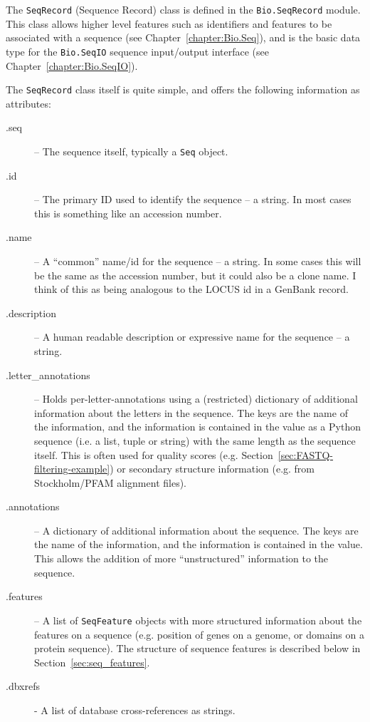 \documentclass{report}
\begin{document}
The \verb|SeqRecord| (Sequence Record) class is defined in the \verb|Bio.SeqRecord| module. This class allows higher level features such as identifiers and features to be associated with a sequence (see Chapter~\ref{chapter:Bio.Seq}), and is the basic data type for the \verb|Bio.SeqIO| sequence input/output interface (see Chapter~\ref{chapter:Bio.SeqIO}).

The \verb|SeqRecord| class itself is quite simple, and offers the following information as attributes:

\begin{description}
  \item[.seq] -- The sequence itself, typically a \verb|Seq| object.

  \item[.id] -- The primary ID used to identify the sequence -- a string. In most cases this is something like an accession number.

  \item[.name] -- A ``common'' name/id for the sequence -- a string. In some cases this will be the same as the accession number, but it could also be a clone name. I think of this as being analogous to the LOCUS id in a GenBank record.

  \item[.description] -- A human readable description or expressive name for the sequence -- a string.
  
  \item[.letter\_annotations] -- Holds per-letter-annotations using a (restricted) dictionary of additional information about the letters in the sequence. The keys are the name of the information, and the information is contained in the value as a Python sequence (i.e. a list, tuple or string) with the same length as the sequence itself.  This is often used for quality scores (e.g. Section~\ref{sec:FASTQ-filtering-example}) or secondary structure information (e.g. from Stockholm/PFAM alignment files).

  \item[.annotations] -- A dictionary of additional information about the sequence. The keys are the name of the information, and the information is contained in the value. This allows the addition of more ``unstructured'' information to the sequence.
  
  \item[.features] -- A list of \verb|SeqFeature| objects with more structured information about the features on a sequence (e.g. position of genes on a genome, or domains on a protein sequence). The structure of sequence features is described below in Section~\ref{sec:seq_features}.
  
  \item[.dbxrefs] - A list of database cross-references as strings.
\end{description}
\end{document}
